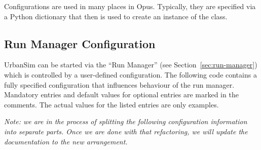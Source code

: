 Configurations are used in many places in Opus.  Typically, they are specified
via a Python \pythonindex dictionary that then is used to create an instance of the
 class.

\subsection{Run Manager Configuration}
\label{sec:run-manager-configuration}
%

UrbanSim can be started via the ``Run Manager'' \runmanagerindex (see
Section~\ref{sec:run-manager}) which is controlled by a user-defined
configuration. The following code contains a fully specified configuration
that influences behaviour of the run manager. \runmanagerindex Mandatory entries and default
values for optional entries are marked in the comments. The actual values for
the listed entries are only examples.

\emph{Note: we are in the process of splitting the following configuration
information into separate parts.  Once we are done with that refactoring,
we will update the documentation to the new arrangement.}

